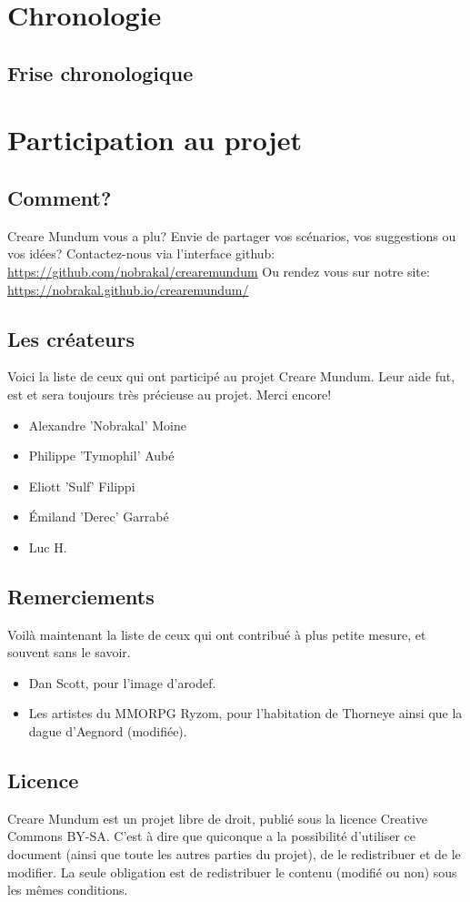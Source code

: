 \documentclass{book}
\begin{document}
\section{Chronologie}
\subsection{Frise chronologique}

\newpage
\section{Participation au projet}
\subsection{Comment?}
\hypertarget{participation}{}
Creare Mundum vous a plu? 
Envie de partager vos scénarios, vos suggestions ou vos idées?
\newline
Contactez-nous via l'interface github: \href {https://github.com/nobrakal/crearemundum} {https://github.com/nobrakal/crearemundum}
\newline
Ou rendez vous sur notre site: \href {https://nobrakal.github.io/crearemundum/} {https://nobrakal.github.io/crearemundum/}
\subsection{Les créateurs}
Voici la liste de ceux qui ont participé au projet Creare Mundum. Leur aide fut, est et sera toujours très précieuse au projet. Merci encore!  
\begin{itemize}
\item Alexandre ’Nobrakal’ Moine 
\item Philippe ’Tymophil’ Aubé 
\item Eliott ’Sulf’ Filippi
\item Émiland ’Derec’ Garrabé
\item Luc H.
\end{itemize}
\subsection{Remerciements}
Voilà maintenant la liste de ceux qui ont contribué à plus petite mesure, et souvent sans le savoir. 
\begin{itemize}
\item Dan Scott, pour l’image d’arodef.
\item Les artistes du MMORPG Ryzom, pour l'habitation de Thorneye ainsi que la dague d'Aegnord (modifiée). 
\end{itemize}
\subsection{Licence}
Creare Mundum est un projet libre de droit, publié sous la licence Creative Commons BY-SA. C'est à dire que quiconque a la possibilité d'utiliser ce document (ainsi que toute les autres parties du projet), de le redistribuer et de le modifier. La seule obligation est de redistribuer le contenu (modifié ou non) sous les mêmes conditions.
\end{document}
